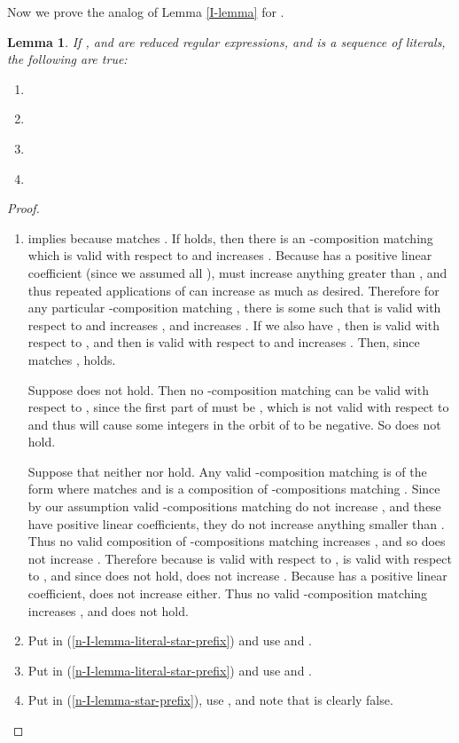 \documentclass[11pt]{amsart}
\newtheorem{lemma}{Lemma}
\theoremstyle{definition}
\theoremstyle{remark}
\begin{document}
Now we prove the analog of Lemma \ref{I-lemma} for .

\begin{lemma} \label{n-I-lemma}
If ,  and  are reduced regular expressions, and  is a sequence of literals, the following are true:
\begin{enumerate}
\item  \label{n-I-lemma-literal-star-prefix}
\item  \label{n-I-lemma-literal-star}
\item  \label{n-I-lemma-star-prefix}
\item  \label{n-I-lemma-star}
\end{enumerate}
\end{lemma}
\begin{proof}
\begin{enumerate}
\item  implies  because  matches . If  holds, then there is an -composition  matching  which is valid with respect to and increases . Because  has a positive linear coefficient (since we assumed all ),  must increase anything greater than , and thus repeated applications of  can increase  as much as desired. Therefore for any particular -composition  matching , there is some  such that  is valid with respect to and increases , and  increases . If we also have , then  is valid with respect to , and then  is valid with respect to and increases . Then, since  matches ,  holds.

Suppose  does not hold. Then no -composition  matching  can be valid with respect to , since the first part of  must be , which is not valid with respect to  and thus will cause some integers in the orbit of  to be negative. So  does not hold.

Suppose that neither  nor  hold. Any valid -composition matching  is of the form  where  matches  and  is a composition of -compositions matching . Since by our assumption valid -compositions matching  do not increase , and these have positive linear coefficients, they do not increase anything smaller than . Thus no valid composition of -compositions matching  increases , and so  does not increase . Therefore because  is valid with respect to ,  is valid with respect to , and since  does not hold,  does not increase . Because  has a positive linear coefficient,  does not increase  either. Thus no valid -composition matching  increases , and  does not hold.
\item Put  in (\ref{n-I-lemma-literal-star-prefix}) and use  and .
\item Put  in (\ref{n-I-lemma-literal-star-prefix}) and use  and .
\item Put  in (\ref{n-I-lemma-star-prefix}), use , and note that  is clearly false. \qedhere
\end{enumerate}
\end{proof}
\end{document}
